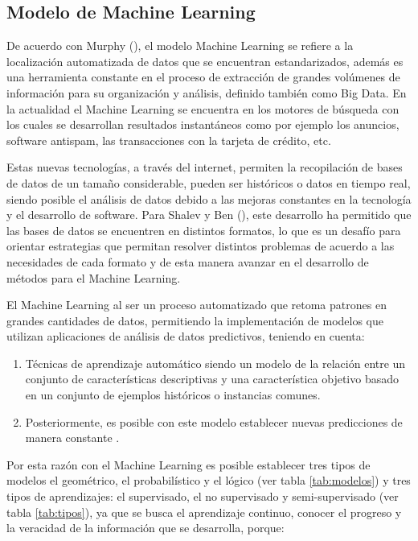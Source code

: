 \subsection{Modelo de Machine Learning}

De acuerdo con Murphy (\citeyear{murphy2012}), el modelo Machine Learning se refiere a la localización automatizada de datos que se encuentran estandarizados, además es una herramienta constante en el proceso de extracción de grandes volúmenes de información para su organización y análisis, definido también como Big Data. En la actualidad el Machine Learning se encuentra en los motores de búsqueda con los cuales se desarrollan resultados instantáneos como por ejemplo los anuncios, software antispam, las transacciones con la tarjeta de crédito, etc.

Estas nuevas tecnologías, a través del internet, permiten la recopilación de bases de datos de un tamaño considerable, pueden ser históricos o datos en tiempo real, siendo posible el análisis de datos debido a las mejoras constantes en la tecnología y el desarrollo de software. Para Shalev y Ben (\citeyear{shalev2014}), este desarrollo ha permitido que las bases de datos se encuentren en distintos formatos, lo que es un desafío para orientar estrategias que permitan resolver distintos problemas de acuerdo a las necesidades de cada formato y de esta manera avanzar en el desarrollo de métodos para el Machine Learning.

El Machine Learning al ser un proceso automatizado que retoma patrones en grandes cantidades de datos, permitiendo la implementación de modelos que utilizan aplicaciones de análisis de datos predictivos, teniendo en cuenta:

    \begin{enumerate}
        \item Técnicas de aprendizaje automático siendo un modelo de la relación entre un conjunto de características descriptivas y una característica objetivo basado en un conjunto de ejemplos históricos o instancias comunes.
        \item Posteriormente, es posible con este modelo establecer nuevas predicciones de manera constante \citep{shalev2014}.
    \end{enumerate}

Por esta razón con el Machine Learning es posible establecer tres tipos de modelos el geométrico, el probabilístico y el lógico (ver tabla \ref{tab:modelos}) y tres tipos de aprendizajes: el supervisado, el no supervisado y semi-supervisado (ver tabla \ref{tab:tipos}), ya que se busca el aprendizaje continuo, conocer el progreso y la veracidad de la información que se desarrolla, porque:


